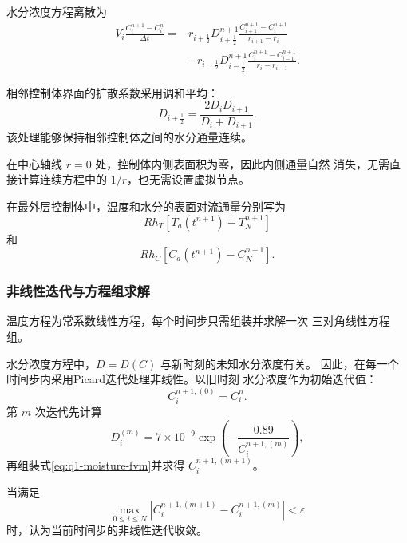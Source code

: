 \documentclass[12pt,a4paper]{article}
\begin{document}
水分浓度方程离散为
\begin{equation}
\begin{aligned}
V_i
\frac{C_i^{n+1}-C_i^n}{\Delta t}
={}&
r_{i+\frac12}D_{i+\frac12}^{n+1}
\frac{C_{i+1}^{n+1}-C_i^{n+1}}
{r_{i+1}-r_i}\\
&-
r_{i-\frac12}D_{i-\frac12}^{n+1}
\frac{C_i^{n+1}-C_{i-1}^{n+1}}
{r_i-r_{i-1}}.
\end{aligned}
\label{eq:q1-moisture-fvm}
\end{equation}

相邻控制体界面的扩散系数采用调和平均：
\begin{equation}
D_{i+\frac12}
=
\frac{2D_iD_{i+1}}{D_i+D_{i+1}}.
\label{eq:q1-harmonic}
\end{equation}
该处理能够保持相邻控制体之间的水分通量连续。

在中心轴线 $r=0$ 处，控制体内侧表面积为零，因此内侧通量自然
消失，无需直接计算连续方程中的 $1/r$，也无需设置虚拟节点。

在最外层控制体中，温度和水分的表面对流通量分别写为
\begin{equation}
Rh_T\left[T_a(t^{n+1})-T_N^{n+1}\right]
\end{equation}
和
\begin{equation}
Rh_C\left[C_a(t^{n+1})-C_N^{n+1}\right].
\end{equation}

\subsubsection{非线性迭代与方程组求解}

温度方程为常系数线性方程，每个时间步只需组装并求解一次
三对角线性方程组。

水分浓度方程中，$D=D(C)$ 与新时刻的未知水分浓度有关。
因此，在每一个时间步内采用Picard迭代处理非线性。以旧时刻
水分浓度作为初始迭代值：
\begin{equation}
C_i^{n+1,(0)}=C_i^n.
\end{equation}
第 $m$ 次迭代先计算
\begin{equation}
D_i^{(m)}
=
7\times10^{-9}
\exp\left(
-\frac{0.89}{C_i^{n+1,(m)}}
\right),
\end{equation}
再组装式\eqref{eq:q1-moisture-fvm}并求得
$C_i^{n+1,(m+1)}$。

当满足
\begin{equation}
\max_{0\le i\le N}
\left|
C_i^{n+1,(m+1)}
-
C_i^{n+1,(m)}
\right|
<\varepsilon
\label{eq:q1-picard-stop}
\end{equation}
时，认为当前时间步的非线性迭代收敛。
\end{document}

